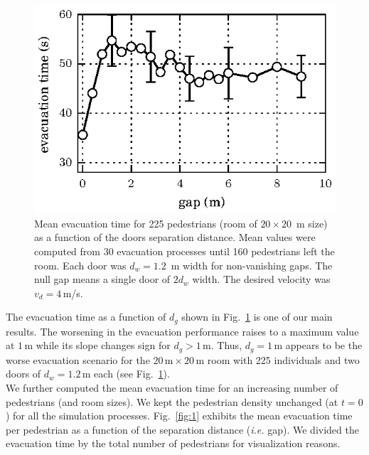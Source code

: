 \begin{figure}
\includegraphics[width=\columnwidth]{./fig8.eps}
\caption{\label{fig:13} Mean evacuation time for 225 pedestrians (room of 
$20\times20$~m size) as a function of the doors separation distance. Mean 
values were computed from 30 evacuation processes until 160 pedestrians left 
the room. Each door was $d_w=1.2$~m width for non-vanishing gaps. The null gap 
means a single door of $2d_w$ width. The desired velocity was $v_d=4\,$m/s. }
\end{figure}

The evacuation time as a function of $d_g$ shown in Fig.~\ref{fig:13} is one 
of our main results. The worsening in the evacuation performance raises to a 
maximum value at $1\,$m while its slope changes sign for $d_g>1\,$m. Thus, 
$d_g=1\,$m appears to be the worse evacuation scenario for the 
$20\,\mathrm{m}\times20\,\mathrm{m}$ room with 225 individuals and two 
doors of $d_w=1.2\,$m each (see Fig.~\ref{fig:13}).  \\


We further computed the mean evacuation time for an increasing number of 
pedestrians (and room sizes). We kept the pedestrian density unchanged (at 
$t=0$) for all the simulation processes. Fig.~\ref{fig:1} exhibits the mean 
evacuation time per pedestrian as a function of the separation distance 
(\emph{i.e.} gap). We divided the evacuation time by the total number of 
pedestrians for visualization reasons. \\


